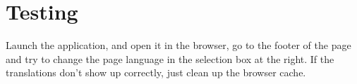\section{Testing}

Launch the application, and open it in the browser, go to the footer of the page and try to change the page language in the selection box at the right. If the translations don't show up correctly, just clean up the browser cache.